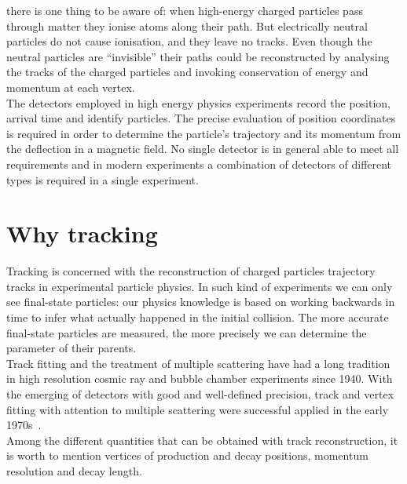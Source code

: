 there is one thing to be aware of: when high-energy charged particles pass
through matter they ionise atoms along their path. But electrically neutral
particles do not cause ionisation, and they leave no tracks. Even though the
neutral particles are ``invisible'' their paths could be reconstructed by
analysing the tracks of the charged particles and
invoking conservation of energy and momentum at each vertex.\\
The detectors employed in high energy physics experiments record the position,
arrival time and identify particles. The precise evaluation of position
coordinates is required in order to determine the particle's trajectory and its
momentum from the deflection in a magnetic field. No single detector is in
general able to meet all requirements and in modern experiments a combination of
detectors of different types is required in a single experiment.


\section{Why tracking}
\label{sec:caratteristiche_si}

Tracking is concerned with the reconstruction of charged particles trajectory
tracks in experimental particle physics.
In such kind of experiments we can only see final-state particles: our physics
knowledge is based on working backwards in time to infer what actually happened
in the initial collision. The more accurate final-state particles are measured,
the more precisely we can determine the parameter of their parents.
\\
Track fitting and the treatment of multiple scattering have had a long tradition
in high resolution cosmic ray and bubble chamber experiments since 1940. With
the emerging of detectors with good and well-defined precision, track and vertex
fitting with attention to multiple scattering were successful applied in the
early 1970s~\cite{Fruhwith}.
\\
Among the different quantities that can be obtained with track reconstruction,
it is worth to mention vertices of production and decay positions, momentum
resolution and decay length.


